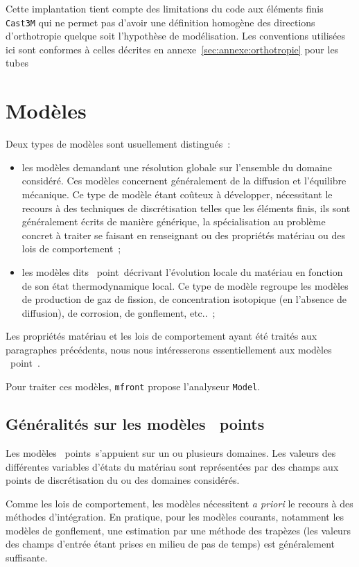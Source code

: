 \documentclass[rectoverso,pleiades,pstricks,leqno,anti]{texmf/note_technique_2010}
\newcommand{\mfront}{\texttt{mfront}}
\newcommand{\castem}{\texttt{Cast3M}}
\begin{document}
Cette implantation tient compte des limitations du code aux
éléments finis \castem{} qui ne permet pas d'avoir une définition
homogène des directions d'orthotropie quelque soit l'hypothèse de
modélisation. Les conventions utilisées ici sont conformes à celles
décrites en annexe~\ref{sec:annexe:orthotropie} pour les tubes

\clearpage
\newpage
\section{Modèles}

Deux types de modèles sont usuellement distingués~:
\begin{itemize}
\item les modèles demandant une résolution globale sur l'ensemble du
  domaine considéré. Ces modèles concernent généralement de la
  diffusion et l'équilibre mécanique. Ce type de modèle étant coûteux
  à développer, nécessitant le recours à des techniques de
  discrétisation telles que les éléments finis, ils sont généralement
  écrits de manière générique, la spécialisation au problème concret à
  traiter se faisant en renseignant ou des propriétés matériau ou des
  lois de comportement~;
\item les modèles dits \og~point~\fg décrivant l'évolution locale du
  matériau en fonction de son état thermodynamique local. Ce type de modèle
  regroupe les modèles de production de gaz de fission, de concentration
  isotopique (en l'absence de diffusion), de corrosion, de gonflement, etc..~;
\end{itemize}

Les propriétés matériau et les lois de comportement ayant été traités aux
paragraphes précédents, nous nous intéresserons essentiellement aux 
modèles \og~point~\fg.

Pour traiter ces modèles, \mfront{} propose l'analyseur \texttt{Model}.

\subsection{Généralités sur les modèles \og~points~\fg}

Les modèles \og~points~\fg s'appuient sur un ou plusieurs domaines.
Les valeurs des différentes variables d'états du matériau sont
représentées par des champs aux points de discrétisation du ou
des domaines considérés.

Comme les lois de comportement, les modèles nécessitent
\textit{a priori} le recours à des méthodes d'intégration.
En pratique, pour les modèles courants, notamment les modèles
de gonflement, une estimation par une méthode des
trapèzes (les valeurs des champs d'entrée étant prises en
milieu de pas de temps) est généralement suffisante.
\end{document}
